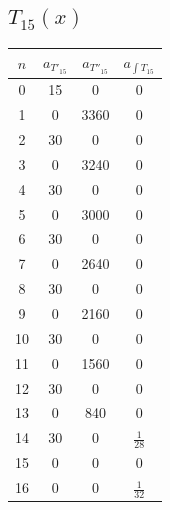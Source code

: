 \documentclass[11pt]{article} %
\begin{document}
\subsection*{$T_{15}(x)$}

\begin{tabular}{| c | c | c | c |}
\hline 
$n$ & $a_{T'_{15}}$ & $a_{T''_{15}}$ & $a_{\int T_{15}}$ \\
\hline \hline
0 & 15 & 0 & 0\\
1 & 0 & 3360 & 0\\
2 & 30& 0 & 0\\
3 & 0& 3240& 0\\
4 & 30 & 0& 0\\
5 & 0 & 3000 & 0\\
6 & 30 & 0 & 0\\
7 & 0 & 2640 & 0\\
8 & 30 & 0 & 0\\
9 & 0 & 2160 & 0\\
10 & 30 & 0 & 0\\
11 &  0& 1560 & 0\\
12 &  30& 0& 0\\
13 &  0& 840& 0\\
14 &  30& 0& $\frac{1}{28}$\\
15 &  0& 0& 0\\
16 &  0& 0& $\frac{1}{32}$\\
\hline
\end{tabular}
\end{document}
